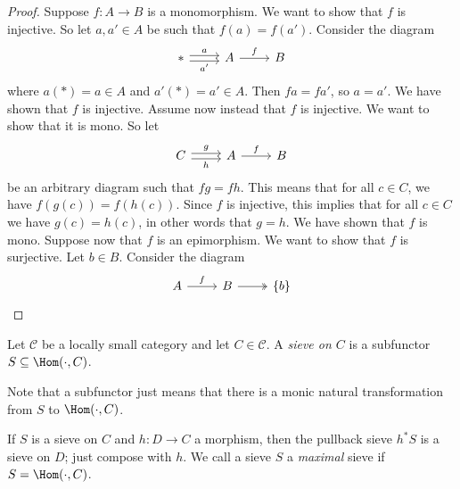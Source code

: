 \begin{proof}
Suppose $f : A \to B$ is a monomorphism. We want to show that $f$ is injective. So let $a,a' \in A$ be such that $f(a) = f(a')$. Consider the diagram
\[ \begin{tikzcd} *
\arrow[r, shift left=0.50ex, "a"] 
\arrow[r, swap, shift right=0.50ex, "a'"]& A \arrow[r, "f"] & B \end{tikzcd} \]
where $a(*) = a \in A$ and $a'(*) = a' \in A$. Then $f a = f a'$, so $a = a'$. We have shown that $f$ is injective. Assume now instead that $f$ is injective. We want to show that it is mono. So let
\[ \begin{tikzcd} C
\arrow[r, shift left=0.50ex, "g"] 
\arrow[r, swap, shift right=0.50ex, "h"]
& A \arrow[r, "f"] & B \end{tikzcd} \]
be an arbitrary diagram such that $fg = fh$. This means that for all $c \in C$, we have $f(g(c)) = f(h(c))$. Since $f$ is injective, this implies that for all $c \in C$ we have $g(c) = h(c)$, in other words that $g = h$. We have shown that $f$ is mono. Suppose now that $f$ is an epimorphism. We want to show that $f$ is surjective. Let $b \in B$. Consider the diagram
\[ \begin{tikzcd} A \arrow[r, "f"] & B \arrow[r, two heads] & \{b\} \end{tikzcd} \]
\end{proof}
\begin{definition}
Let $\mathcal{C}$ be a locally small category and let $C \in \mathcal{C}$. A \emph{sieve on $C$} is a subfunctor $S \subseteq \Hom(\cdot,C)$.
\end{definition}
Note that a subfunctor just means that there is a monic natural transformation from $S$ to $\Hom(\cdot,C)$.

If $S$ is a sieve on $C$ and $h : D \to C$ a morphism, then the pullback sieve $h^*S$ is a sieve on $D$; just compose with $h$. We call a sieve $S$ a \emph{maximal} sieve if $S = \Hom(\cdot, C)$.

